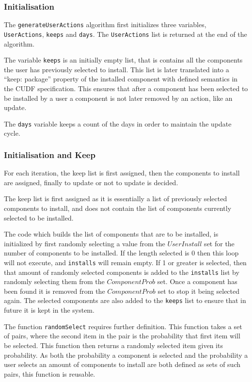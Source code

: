 \subsubsection{Initialisation}
The \verb+generateUserActions+ algorithm first initializes three variables, \verb+UserActions+, \verb+keeps+ and \verb+days+.
The \verb+UserActions+ list is returned at the end of the algorithm.

The variable \verb+keeps+ is an initially empty list, that is contains all the components the user has previously selected to install.
This list is later translated into a ``keep: package'' property of the installed component with defined semantics in the CUDF specification.
This ensures that after a component has been selected to be installed by a user a component is not later removed by an action, like an update.

The \verb+days+ variable keeps a count of the days in order to maintain the update cycle. 

\subsubsection{Initialisation and Keep}
For each iteration, the keep list is first assigned, then the components to install are assigned, finally to update or not to update is decided.

The keep list is first assigned as it is essentially a list of previously selected components to install, and does not contain the list of components currently selected to be installed.

The code which builds the list of components that are to be installed, is initialized by first randomly selecting a value from the $UserInstall$ set for the number of components to be installed.
If the length selected is 0 then this loop will not execute, and \verb+installs+ will remain empty.
If 1 or greater is selected, then that amount of randomly selected components is added to the \verb+installs+ list by randomly selecting them from the $ComponentProb$ set.
Once a component has been found it is removed from the $ComponentProb$ set to stop it being selected again.
The selected components are also added to the \verb+keeps+ list to ensure that in future it is kept in the system.
 
The function \verb+randomSelect+ requires further definition.
This function takes a set of pairs, where the second item in the pair is the probability that first item will be selected.
This function then returns a randomly selected item given its probability.
As both the probability a component is selected and the probability a user selects an amount of components to install are both defined as sets of such pairs, this function is reusable.

